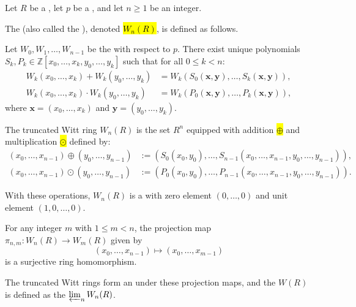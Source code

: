 
\begin{definition}\label{definition:truncated_witt_ring_of_length_n_over_a_commutative_ring}
Let $R$ be a , let $p$ be a , and let $n \geq 1$ be an integer.

The  (also called the ), denoted \hl{$W_n(R)$}, is defined as follows.

Let $W_0, W_1, \dots, W_{n-1}$ be the  with respect to $p$. There exist unique polynomials $S_k, P_k \in \mathbb{Z}[x_0, \dots, x_k, y_0, \dots, y_k]$ such that for all $0 \leq k < n$:
\begin{align*}
    W_k(x_0, \dots, x_k) + W_k(y_0, \dots, y_k) &= W_k(S_0(\mathbf{x}, \mathbf{y}), \dots, S_k(\mathbf{x}, \mathbf{y})), \\
    W_k(x_0, \dots, x_k) \cdot W_k(y_0, \dots, y_k) &= W_k(P_0(\mathbf{x}, \mathbf{y}), \dots, P_k(\mathbf{x}, \mathbf{y})),
\end{align*}
where $\mathbf{x} = (x_0, \dots, x_k)$ and $\mathbf{y} = (y_0, \dots, y_k)$.

The truncated Witt ring $W_n(R)$ is the set $R^n$ equipped with addition \hl{$\oplus$} and multiplication \hl{$\odot$} defined by:
\begin{align*}
    (x_0, \dots, x_{n-1}) \oplus (y_0, \dots, y_{n-1}) &:= (S_0(x_0, y_0), \dots, S_{n-1}(x_0, \dots, x_{n-1}, y_0, \dots, y_{n-1})), \\
    (x_0, \dots, x_{n-1}) \odot (y_0, \dots, y_{n-1}) &:= (P_0(x_0, y_0), \dots, P_{n-1}(x_0, \dots, x_{n-1}, y_0, \dots, y_{n-1})).
\end{align*}

With these operations, $W_n(R)$ is a  with zero element $(0, \dots, 0)$ and unit element $(1, 0, \dots, 0)$.

For any integer $m$ with $1 \leq m < n$, the projection map $\pi_{n,m}: W_n(R) \to W_m(R)$ given by
$$
    (x_0, \dots, x_{n-1}) \mapsto (x_0, \dots, x_{m-1})
$$
is a surjective ring homomorphism.

The truncated Witt rings form an  under these projection maps, and the  $W(R)$ is defined as the  $\varprojlim_n W_n(R)$.
\end{definition}
